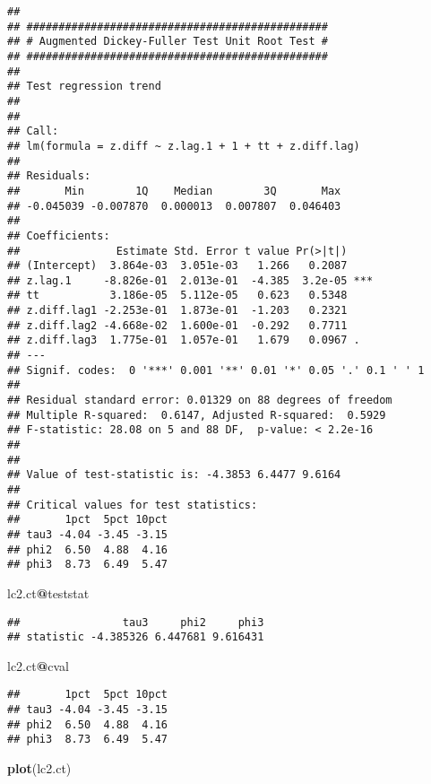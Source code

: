 \documentclass[]{book}
\newenvironment{Shaded}{\begin{snugshade}}{\end{snugshade}}
\newcommand{\KeywordTok}[1]{\textcolor[rgb]{0.13,0.29,0.53}{\textbf{#1}}}
\newcommand{\OperatorTok}[1]{\textcolor[rgb]{0.81,0.36,0.00}{\textbf{#1}}}
\newcommand{\NormalTok}[1]{#1}
\theoremstyle{definition}
\theoremstyle{definition}
\theoremstyle{definition}
\theoremstyle{remark}
\begin{document}
\begin{verbatim}
## 
## ############################################### 
## # Augmented Dickey-Fuller Test Unit Root Test # 
## ############################################### 
## 
## Test regression trend 
## 
## 
## Call:
## lm(formula = z.diff ~ z.lag.1 + 1 + tt + z.diff.lag)
## 
## Residuals:
##       Min        1Q    Median        3Q       Max 
## -0.045039 -0.007870  0.000013  0.007807  0.046403 
## 
## Coefficients:
##               Estimate Std. Error t value Pr(>|t|)    
## (Intercept)  3.864e-03  3.051e-03   1.266   0.2087    
## z.lag.1     -8.826e-01  2.013e-01  -4.385  3.2e-05 ***
## tt           3.186e-05  5.112e-05   0.623   0.5348    
## z.diff.lag1 -2.253e-01  1.873e-01  -1.203   0.2321    
## z.diff.lag2 -4.668e-02  1.600e-01  -0.292   0.7711    
## z.diff.lag3  1.775e-01  1.057e-01   1.679   0.0967 .  
## ---
## Signif. codes:  0 '***' 0.001 '**' 0.01 '*' 0.05 '.' 0.1 ' ' 1
## 
## Residual standard error: 0.01329 on 88 degrees of freedom
## Multiple R-squared:  0.6147, Adjusted R-squared:  0.5929 
## F-statistic: 28.08 on 5 and 88 DF,  p-value: < 2.2e-16
## 
## 
## Value of test-statistic is: -4.3853 6.4477 9.6164 
## 
## Critical values for test statistics: 
##       1pct  5pct 10pct
## tau3 -4.04 -3.45 -3.15
## phi2  6.50  4.88  4.16
## phi3  8.73  6.49  5.47
\end{verbatim}

\begin{Shaded}
\begin{Highlighting}[]
\NormalTok{lc2.ct}\OperatorTok{@}\NormalTok{teststat}
\end{Highlighting}
\end{Shaded}

\begin{verbatim}
##                tau3     phi2     phi3
## statistic -4.385326 6.447681 9.616431
\end{verbatim}

\begin{Shaded}
\begin{Highlighting}[]
\NormalTok{lc2.ct}\OperatorTok{@}\NormalTok{cval}
\end{Highlighting}
\end{Shaded}

\begin{verbatim}
##       1pct  5pct 10pct
## tau3 -4.04 -3.45 -3.15
## phi2  6.50  4.88  4.16
## phi3  8.73  6.49  5.47
\end{verbatim}

\begin{Shaded}
\begin{Highlighting}[]
\KeywordTok{plot}\NormalTok{(lc2.ct)}
\end{Highlighting}
\end{Shaded}
\end{document}

